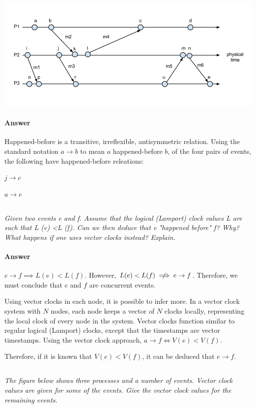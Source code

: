 \documentclass{article}
\newcommand{\question}[1]{\subsection{}\textit{#1}\bigskip}
\newcommand{\answer}{\paragraph{Answer}}
\begin{document}
\includegraphics[width=\textwidth]{images/T3-1.png}

\answer
Happened-before is a transitive, irreflexible, antisymmetric relation.
Using the standard notation $ a \rightarrow b $ to mean $ a $ happened-before $ b$, of the four pairs of events, the following have happened-before releations:

\begin{itemize}
\begin{centering}
    \item{$ j \rightarrow c $}
    \item{$ a \rightarrow e $}
    \\
\end{centering}
\end{itemize}

\question{Given two events e and f. Assume that the logical (Lamport) clock values L are such that L (e) <L (f). Can we then deduce that e "happened before" f? Why? What happens if one uses vector clocks instead? Explain.}

\answer
$ e \rightarrow f \implies L(e) < L(f) $. However, $ L(e) < L(f) \centernot\implies e \rightarrow f $.
Therefore, we must conclude that $ e $ and $ f $ are concurrent events.

Using vector clocks in each node, it is possible to infer more.
In a vector clock system with $ N $ nodes, each node keeps a vector of $ N $ clocks locally, representing the local clock of every node in the system.
Vector clocks function similar to regular logical (Lamport) clocks, except that the timestamps are vector timestamps.
Using the vector clock approach, $ a \rightarrow f \iff V(e) < V(f) $.

Therefore, if it is known that $ V(e) < V(f) $, it can be deduced that $ e \rightarrow f $.

\question{The figure below shows three processes and a number of events. Vector clock values are given for some of the events. Give the vector clock values for the remaining events.}
\end{document}
